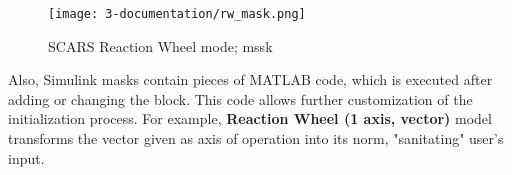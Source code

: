         \begin{figure}[H]
            \centering
            \texttt{[image: 3-documentation/rw\_mask.png]}
            \caption{SCARS Reaction Wheel mode; mssk}
            \label{fig:model_mask}
        \end{figure}
        
        Also, Simulink masks contain pieces of MATLAB code, which is executed after adding or changing the block. This code allows further customization of the initialization process. For example, \textbf{Reaction Wheel (1 axis, vector)} model transforms the vector given as axis of operation into its norm, "sanitating" user's input\cite{input_sanitization}. 
